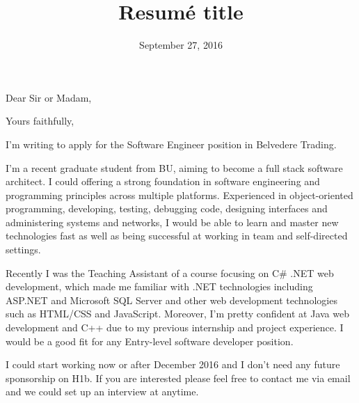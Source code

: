 \documentclass[11pt,a4paper,sans]{moderncv}        %
\title{Resumé title}                               %
\begin{document}
\date{September 27, 2016}
\opening{Dear Sir or Madam,}
\closing{Yours faithfully,}
\makelettertitle

I'm writing to apply for the Software Engineer position in Belvedere Trading.

I'm a recent graduate student from BU, aiming to become a full stack software architect. I could offering a strong foundation in software engineering and programming principles across multiple platforms. Experienced in object-oriented programming, developing, testing, debugging code, designing interfaces and administering systems and networks, 	I would be able to learn and master new technologies fast as well as being successful at working in team and self-directed settings.

Recently I was the Teaching Assistant of a course focusing on C\# .NET web development, which made me familiar with .NET technologies including ASP.NET and Microsoft SQL Server and other web development technologies such as HTML/CSS and JavaScript. Moreover, I'm pretty confident at Java web development and C++ due to my previous internship and project experience. I would be a good fit for any Entry-level software developer position.

I could start working now or after December 2016 and I don't need any future sponsorship on H1b. If you are interested please feel free to contact me via email and we could set up an interview at anytime.





\makeletterclosing
\end{document}
